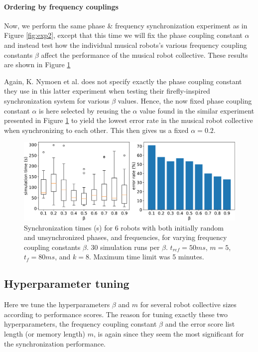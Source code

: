 	
		\paragraph{Ordering by frequency couplings}
		
		Now, we perform the same phase \& frequency synchronization experiment as in Figure \ref{fig:exp2}, except that this time we will fix the phase coupling constant $\alpha$ and instead test how the individual musical robots's various frequency coupling constants $\beta$ affect the performance of the musical robot collective. These results are shown in Figure \ref{fig:exp3}
		
		Again, K. Nymoen et al. does not specify exactly the phase coupling constant they use in this latter experiment when testing their firefly-inspired synchronization system for various $\beta$ values. Hence, the now fixed phase coupling constant $\alpha$ is here selected by reusing the $\alpha$ value found in the similar experiment presented in Figure \ref{fig:exp3} to yield the lowest error rate in the musical robot collective when synchronizing to each other. This then gives us a fixed $\alpha = 0.2$.
		
		\begin{figure}[ht!]
			\centering
			\includegraphics[width=\linewidth]{Assets/DocSegments/Chapters/ExperimentsAndResults/Figures/PerfScores/experiment3_perfScores.pdf}
			\caption{Synchronization times (s) for 6 robots with both initially random and unsynchronized phases, and frequencies, for varying frequency coupling constants $\beta$. 30 simulation runs per $\beta$. $t_{ref}=50ms$, $m=5$, $t_f=80ms$, and $k=8$. Maximum time limit was 5 minutes.}
			\label{fig:exp3}
		\end{figure}
		
		
	\subsection{Hyperparameter tuning}
	
	Here we tune the hyperparameters $\beta$ and $m$ for several robot collective sizes according to performance scores. The reason for tuning exactly these two hyperparameters, the frequency coupling constant $\beta$ and the error score list length (or memory length) $m$, is again since they seem the most significant for the synchronization performance.
	

